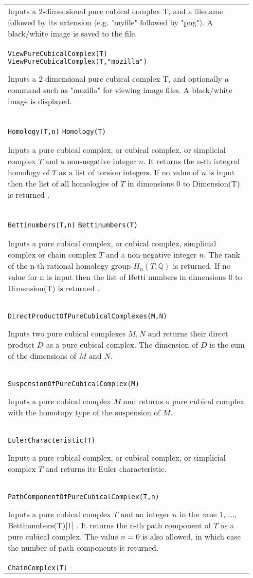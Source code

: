 \documentclass[a4paper,11pt]{report}
\begin{document}
{\begin{center}
\begin{tabular}{|l|}
 Inputs a 2-dimensional pure cubical complex T, and a filename followed by its
extension (e.g. "myfile" followed by "png"). A black/white image is saved to
the file. \\
 \index{ViewPureCubicalComplex} \texttt{ViewPureCubicalComplex(T)} \texttt{ViewPureCubicalComplex(T,"mozilla")} 

 Inputs a 2-dimensional pure cubical complex T, and optionally a command such
as "mozilla" for viewing image files. A black/white image is displayed. \\
 \index{Homology} \texttt{Homology(T,n)} \texttt{Homology(T)} 

 Inputs a pure cubical complex, or cubical complex, or simplicial complex $T$ and a non-negative integer $n$. It returns the n-th integral homology of $T$ as a list of torsion integers. If no value of $n$ is input then the list of all homologies of $T$ in dimensions 0 to Dimension(T) is returned . \\
 \index{Bettinumbers} \texttt{Bettinumbers(T,n)} \texttt{Bettinumbers(T)} 

 Inputs a pure cubical complex, or cubical complex, simplicial complex or chain
complex $T$ and a non-negative integer $n$. The rank of the n-th rational homology group $H_n(T,\mathbb Q)$ is returned. If no value for n is input then the list of Betti numbers in
dimensions 0 to Dimension(T) is returned . \\
 \index{DirectProductOfPureCubicalComplexes} \texttt{DirectProductOfPureCubicalComplexes(M,N)} 

 Inputs two pure cubical complexes $M,N$ and returns their direct product $D$ as a pure cubical complex. The dimension of $D$ is the sum of the dimensions of $M$ and $N$. \\
 \index{SuspensionOfPureCubicalComplex} \texttt{SuspensionOfPureCubicalComplex(M)} 

 Inputs a pure cubical complex $M$ and returns a pure cubical complex with the homotopy type of the suspension of $M$. \\
 \texttt{EulerCharacteristic(T)} 

 Inputs a pure cubical complex, or cubical complex, or simplicial complex $T$ and returns its Euler characteristic. \\
 \index{PathComponentOfPureCubicalComplex} \texttt{PathComponentOfPureCubicalComplex(T,n)} 

 Inputs a pure cubical complex $T$ and an integer $n$ in the rane 1, ..., Bettinumbers(T)[1] . It returns the n-th path component of $T$ as a pure cubical complex. The value $n=0$ is also allowed, in which case the number of path components is returned. \\
 \texttt{ChainComplex(T)} 


\end{tabular}
\end{center}}
\end{document}

